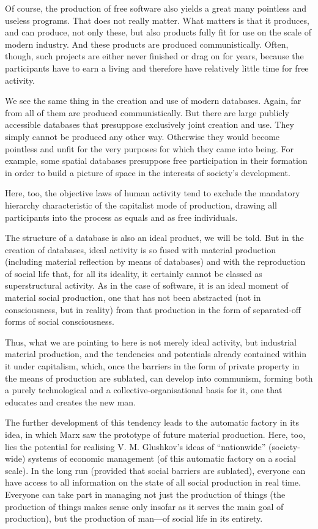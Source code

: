 \documentclass[../main]{subfiles}
\begin{document}
Of course, the production of free software also yields a great many pointless and useless programs. That does not really matter. What matters is that it produces, and can produce, not only these, but also products fully fit for use on the scale of modern industry. And these products are produced communistically. Often, though, such projects are either never finished or drag on for years, because the participants have to earn a living and therefore have relatively little time for free activity.

We see the same thing in the creation and use of modern databases. Again, far from all of them are produced communistically. But there are large publicly accessible databases that presuppose exclusively joint creation and use. They simply cannot be produced any other way. Otherwise they would become pointless and unfit for the very purposes for which they came into being. For example, some spatial databases presuppose free participation in their formation in order to build a picture of space in the interests of society's development.

Here, too, the objective laws of human activity tend to exclude the mandatory hierarchy characteristic of the capitalist mode of production, drawing all participants into the process as equals and as free individuals.

The structure of a database is also an ideal product, we will be told. But in the creation of databases, ideal activity is so fused with material production (including material reflection by means of databases) and with the reproduction of social life that, for all its ideality, it certainly cannot be classed as superstructural activity. As in the case of software, it is an ideal moment of material social production, one that has not been abstracted (not in consciousness, but in reality) from that production in the form of separated-off forms of social consciousness.

Thus, what we are pointing to here is not merely ideal activity, but industrial material production, and the tendencies and potentials already contained within it under capitalism, which, once the barriers in the form of private property in the means of production are sublated, can develop into communism, forming both a purely technological and a collective-organisational basis for it, one that educates and creates the new man.

The further development of this tendency leads to the automatic factory in its idea, in which Marx saw the prototype of future material production. Here, too, lies the potential for realising V. M. Glushkov’s ideas of “nationwide” (society-wide) systems of economic management (of this automatic factory on a social scale). In the long run (provided that social barriers are sublated), everyone can have access to all information on the state of all social production in real time. Everyone can take part in managing not just the production of things (the production of things makes sense only insofar as it serves the main goal of production), but the production of man—of social life in its entirety.
\end{document}
